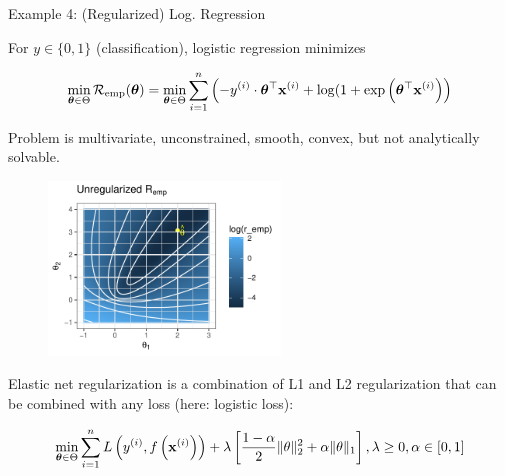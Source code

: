 \documentclass[11pt,compress,t,notes=noshow, xcolor=table]{beamer}
\begin{document}
\begin{vbframe}{Example 4: (Regularized) Log. Regression}

\vspace*{-0.5cm}

For $y \in \{0, 1\}$ (classification), logistic regression minimizes 

\vspace*{-0.5cm}

\begin{eqnarray*}
	\min_{\bm{\theta} \in \Theta} \mathcal{R}_{\text{emp}}(\bm{\theta}) = \min_{\bm{\theta} \in \Theta} \sum\limits_{i=1}^n \left(-y^{(i)} \cdot \bm{\theta}^\top\mathbf{x}^{(i)} + \log(1 + \exp\left(\bm{\theta}^\top\mathbf{x}^{(i)}\right)\right) 
\end{eqnarray*}

Problem is multivariate, unconstrained, smooth, convex, but not analytically solvable. 

\vspace*{-0.3cm}

\begin{figure}
	\includegraphics[width=0.55\textwidth]{figure_man/logreg-0.pdf}
\end{figure}

\framebreak 

\vspace*{-0.8cm}

Elastic net regularization is a combination of L1 and L2 regularization that can be combined with any loss (here: logistic loss): 

\vspace*{-0.3cm}

\begin{footnotesize}
\begin{eqnarray*}
	\min_{\bm{\theta} \in \Theta} \sum\limits_{i=1}^n L\left(y^{(i)}, f\left(\mathbf{x}^{(i)}\right)\right) + \lambda \left[\frac{1-\alpha}{2}\|\theta\|^{2}_{2} + \alpha\|\theta\|_{1}\right], \lambda \geq 0, \alpha \in [0,1]
\end{eqnarray*}
\end{footnotesize}

\vspace*{-0.6cm}


\end{vbframe}
\end{document}

